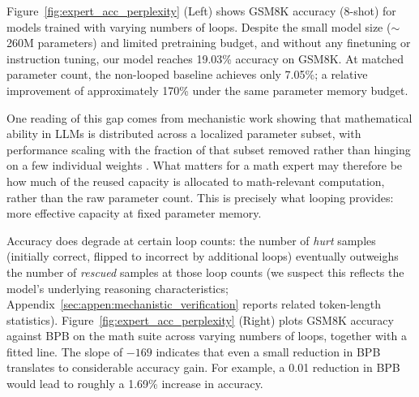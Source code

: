 Figure~\ref{fig:expert_acc_perplexity} (Left) shows GSM8K accuracy (8-shot) for models trained with varying numbers of loops. Despite the small model size ($\sim$260M parameters) and limited pretraining budget, and without any finetuning or instruction tuning, our model reaches 19.03\% accuracy on GSM8K. At matched parameter count, the non-looped baseline achieves only 7.05\%; a relative improvement of approximately 170\% under the same parameter memory budget. 

One reading of this gap comes from mechanistic work showing that mathematical ability in LLMs is distributed across a localized parameter subset, with performance scaling with the fraction of that subset removed rather than hinging on a few individual weights \citep{shomali2026llm}. What matters for a math expert may therefore be how much of the reused capacity is allocated to math-relevant computation, rather than the raw parameter count. This is precisely what looping provides: more effective capacity at fixed parameter memory.

Accuracy does degrade at certain loop counts: the number of \emph{hurt} samples (initially correct, flipped to incorrect by additional loops) eventually outweighs the number of \emph{rescued} samples at those loop counts (we suspect this reflects the model's underlying reasoning characteristics; Appendix~\ref{sec:appen:mechanistic_verification} reports related token-length statistics).
Figure~\ref{fig:expert_acc_perplexity} (Right) plots GSM8K accuracy against BPB on the math suite across varying numbers of loops, together with a fitted line. The slope of $-169$ indicates that even a small reduction in BPB translates to considerable accuracy gain. For example, a 0.01 reduction in BPB would lead to roughly a 1.69\% increase in accuracy.












